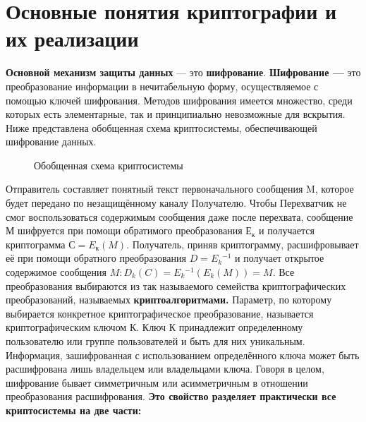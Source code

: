 \documentclass[a4paper,14pt]{report}
\begin{document}
\section{Основные понятия криптографии и их реализации}
\textbf{Основной механизм защиты данных} — это \textbf{шифрование}.    
\textbf{Шифрование —} это преобразование информации в нечитабельную форму, осуществляемое с помощью ключей шифрования. Методов шифрования имеется множество, среди которых есть элементарные, так и принципиально невозможные для вскрытия. Ниже представлена обобщенная схема криптосистемы, обеспечивающей шифрование данных.

\begin{figure}[h]
\caption{Обобщенная схема криптосистемы}
\label{fig:image}
\end{figure}

Отправитель составляет понятный текст первоначального сообщения M, которое будет передано по незащищённому каналу Получателю. Чтобы Перехватчик не смог воспользоваться содержимым сообщения даже после перехвата, сообщение М шифруется при помощи обратимого преобразования $Е_{к}$ и получается криптограмма $С = E_{к}(M)$. Получатель, приняв криптограмму, расшифровывает её при помощи  обратного преобразования $D = E{_k}^{-1}$ и получает открытое содержимое сообщения
\hfill \break
 $M: D_k(C) = E{_k}^{-1}(E_k(M)) = M.$
\hfill \break
Все преобразования выбираются из так называемого семейства криптографических преобразований, называемых \textbf{криптоалгоритмами.} Параметр, по которому выбирается конкретное криптографическое преобразование, называется криптографическим ключом $К$. Ключ $К$ принадлежит определенному пользователю или группе пользователей и быть для них уникальным. Информация, зашифрованная с использованием определённого ключа может быть расшифрована лишь владельцем или владельцами ключа.
\hfill \break
Говоря в целом, шифрование бывает симметричным или асимметричным в отношении преобразования расшифрования. 
\hfill \break
\textbf{Это свойство разделяет практически все криптосистемы на две части:}
\end{document}
